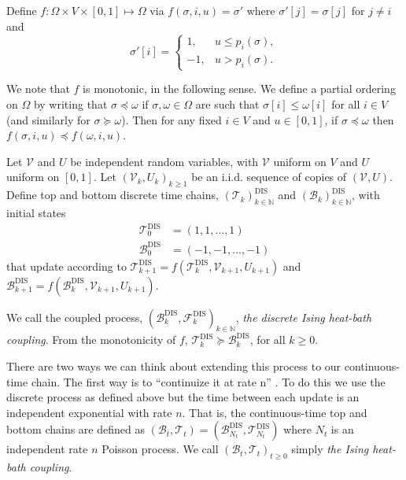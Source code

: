 	Define $f: \Omega \times V \times [0,1] \mapsto \Omega$ via $f(\sigma, i, u) = \sigma'$ where $\sigma'[j] = \sigma[j]$ for $j \neq i$ and
	\begin{equation}
		\sigma'[i] = 
			\begin{cases}
				1, &u \leq p_i(\sigma),\\
				-1, &u > p_i(\sigma).
			\end{cases}
		\label{eq:plusorminusrules}
	\end{equation}

	We note that $f$ is monotonic, in the following sense. We define a partial ordering on $\Omega$ by writing that $\sigma \preceq \omega$ if $\sigma, \omega \in \Omega$ are such that $\sigma[i] \leq \omega[i]$ for all $i \in V$ (and similarly for $\sigma \succeq \omega$). Then for any fixed $i \in V$ and $u \in [0,1]$, if $\sigma \preceq \omega$ then $f(\sigma, i, u) \preceq f(\omega, i, u)$.
	
	Let $\mathscr{V}$ and $U$ be independent random variables, with $\mathscr{V}$ uniform on $V$ and $U$ uniform on $[0,1]$. Let $(\mathscr{V}_k, U_k)_{k \geq 1}$ be an i.i.d. sequence of copies of $(\mathscr{V}, U)$. Define top and bottom discrete time chains, $(\mathscr{T}_k)_{k\in \mathbb{N}}^\mathrm{DIS}$ and $(\mathscr{B}_k)_{k\in \mathbb{N}}^\mathrm{DIS}$, with initial states
	\begin{align}
		\mathscr{T}_0^\mathrm{DIS} &= (1, 1, \dots, 1)\\
		\mathscr{B}_0^\mathrm{DIS} &= (-1, -1, \dots, -1)
	\end{align}
	that update according to $\mathscr{T}_{k+1}^\mathrm{DIS} = f(\mathscr{T}_{k}^\mathrm{DIS}, \mathscr{V}_{k+1}, U_{k+1})$ and $\mathscr{B}_{k+1}^\mathrm{DIS} = f(\mathscr{B}_{k}^\mathrm{DIS}, \mathscr{V}_{k+1}, U_{k+1})$.

	We call the coupled process, $(\mathscr{B}_k^\mathrm{DIS}, \mathscr{F}_k^\mathrm{DIS})_{k\in \mathbb{N}}$, \emph{the discrete Ising heat-bath coupling}. From the monotonicity of $f$, $\mathscr{T}_k^\mathrm{DIS} \succeq \mathscr{B}_k^\mathrm{DIS}$, for all $k \geq 0$.

	There are two ways we can think about extending this process to our continuous-time chain. The first way is to ``continuize it at rate n'' \cite{Levin2009-fo}. To do this we use the discrete process as defined above but the time between each update is an independent exponential with rate $n$. That is, the continuous-time top and bottom chains are defined as $(\mathscr{B}_t, \mathscr{T}_t) = (\mathscr{B}_{N_t}^\mathrm{DIS}, \mathscr{T}_{N_t}^\mathrm{DIS})$ where $N_t$ is an independent rate $n$ Poisson process. We call $(\mathscr{B}_t, \mathscr{T}_t)_{t\geq 0}$ simply \emph{the Ising heat-bath coupling}.

